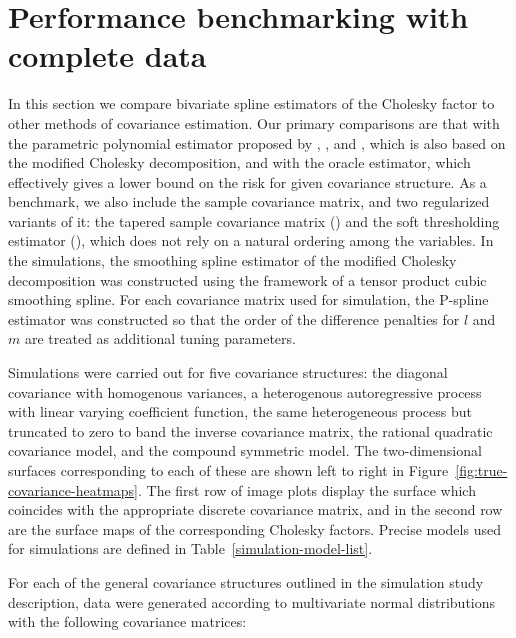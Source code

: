 \section{Performance benchmarking with complete data}

In this section we compare bivariate spline estimators of the Cholesky factor to other methods of covariance estimation. Our primary comparisons are that with the parametric polynomial estimator proposed by \cite{pourahmadi1999joint},  \cite{pan2003modelling}, and \cite{pourahmadi2002dynamic}, which is also based on the modified Cholesky decomposition, and with the oracle estimator, which effectively gives a lower bound on the risk for given covariance structure. As a benchmark, we also include the sample covariance matrix, and two regularized variants of it: the tapered sample covariance matrix (\cite{cai2010optimal}) and the soft thresholding estimator (\cite{rothman2009generalized}), which does not rely on a natural ordering among the variables. In the simulations, the smoothing spline estimator of the modified Cholesky decomposition was constructed using the framework of a tensor product cubic smoothing spline. For each covariance matrix used for simulation, the P-spline estimator was constructed so that the order of the difference penalties for $l$ and $m$ are treated as additional tuning parameters.

\bigskip

Simulations were carried out for five covariance structures: the diagonal covariance with homogenous variances, a heterogenous autoregressive process with linear varying coefficient function, the same heterogeneous process but truncated to zero to band the inverse covariance matrix, the rational quadratic covariance model, and the compound symmetric model. The two-dimensional surfaces corresponding to each of these are shown left to right in Figure~\ref{fig:true-covariance-heatmaps}. The first row of image plots display the surface which coincides with the appropriate discrete covariance matrix, and in the second row are the surface maps of the corresponding Cholesky factors. Precise models used for simulations are defined in Table~\ref{simulation-model-list}. 


For each of the general covariance structures outlined in the simulation study description, data were generated according to multivariate normal distributions with the following covariance matrices: 


